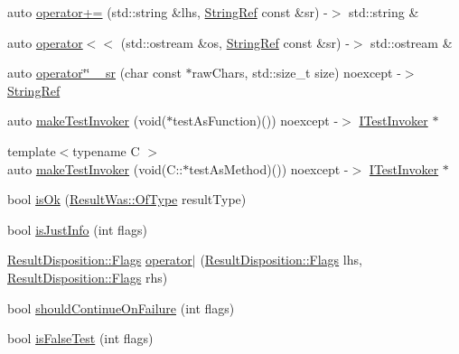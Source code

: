 \begin{DoxyCompactItemize}
\item 
auto \mbox{\hyperlink{namespace_catch_a61711bc909f8dc76d8b3deccc1440f46}{operator+=}} (std\+::string \&lhs, \mbox{\hyperlink{class_catch_1_1_string_ref}{String\+Ref}} const \&sr) -\/$>$ std\+::string \&
\item 
auto \mbox{\hyperlink{namespace_catch_a5e37b333d756a28e12d44977f063af43}{operator$<$$<$}} (std\+::ostream \&os, \mbox{\hyperlink{class_catch_1_1_string_ref}{String\+Ref}} const \&sr) -\/$>$ std\+::ostream \&
\item 
auto \mbox{\hyperlink{namespace_catch_a36bf2a7f244cdce2d6729e53658d2370}{operator\char`\"{}\char`\"{} \+\_\+sr}} (char const $\ast$raw\+Chars, std\+::size\+\_\+t size) noexcept -\/$>$ \mbox{\hyperlink{class_catch_1_1_string_ref}{String\+Ref}}
\item 
auto \mbox{\hyperlink{namespace_catch_ab3d8ccbc900fe50322c39ecbba52f536}{make\+Test\+Invoker}} (void($\ast$test\+As\+Function)()) noexcept -\/$>$ \mbox{\hyperlink{struct_catch_1_1_i_test_invoker}{I\+Test\+Invoker}} $\ast$
\item 
{\footnotesize template$<$typename C $>$ }\\auto \mbox{\hyperlink{namespace_catch_a82a954c4d70afa716115820dc7dc8d24}{make\+Test\+Invoker}} (void(C\+::$\ast$test\+As\+Method)()) noexcept -\/$>$ \mbox{\hyperlink{struct_catch_1_1_i_test_invoker}{I\+Test\+Invoker}} $\ast$
\item 
bool \mbox{\hyperlink{namespace_catch_a5205869c81c06d3460759cb86676ae68}{is\+Ok}} (\mbox{\hyperlink{struct_catch_1_1_result_was_a624e1ee3661fcf6094ceef1f654601ef}{Result\+Was\+::\+Of\+Type}} result\+Type)
\item 
bool \mbox{\hyperlink{namespace_catch_a54b01af61673a3e1f21f31713639b180}{is\+Just\+Info}} (int flags)
\item 
\mbox{\hyperlink{struct_catch_1_1_result_disposition_a3396cad6e2259af326b3aae93e23e9d8}{Result\+Disposition\+::\+Flags}} \mbox{\hyperlink{namespace_catch_ab32a083e442cc09f736327d2e2865999}{operator$\vert$}} (\mbox{\hyperlink{struct_catch_1_1_result_disposition_a3396cad6e2259af326b3aae93e23e9d8}{Result\+Disposition\+::\+Flags}} lhs, \mbox{\hyperlink{struct_catch_1_1_result_disposition_a3396cad6e2259af326b3aae93e23e9d8}{Result\+Disposition\+::\+Flags}} rhs)
\item 
bool \mbox{\hyperlink{namespace_catch_a7f7480b15d74965459c844f0d393ed87}{should\+Continue\+On\+Failure}} (int flags)
\item 
bool \mbox{\hyperlink{namespace_catch_a93ef4e3e307a2021ca0d41b32c0e54b0}{is\+False\+Test}} (int flags)

\end{DoxyCompactItemize}
